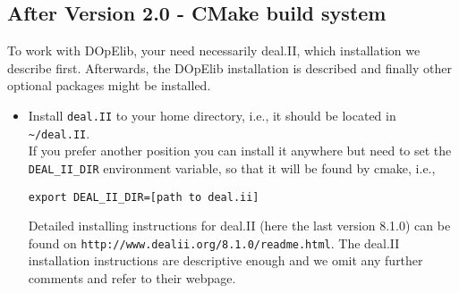 \subsection{After Version 2.0 - CMake build system}
To work with DOpElib, your need necessarily deal.II, which installation 
we describe first. Afterwards, the DOpElib installation is described and finally
other optional packages might be installed.
\begin{itemize}
\item Install \texttt{deal.II} to your home directory, i.e., it should be located in \\
\texttt{\textasciitilde/deal.II}. \\[1mm]
If you prefer another position you can install it anywhere but need 
to set the \texttt{DEAL\_II\_DIR} environment variable, so that it 
will be found by cmake, i.e.,
\begin{lstlisting}
export DEAL_II_DIR=[path to deal.ii]
\end{lstlisting}
Detailed installing instructions for deal.II (here the last version
8.1.0) can be found on 
\texttt{http://www.dealii.org/8.1.0/readme.html}. The deal.II 
installation instructions are descriptive enough and we omit 
any further comments and refer to their webpage.
%


\end{itemize}
